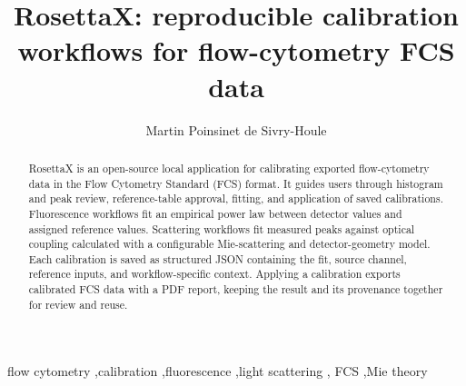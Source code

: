 \documentclass[preprint,12pt]{elsarticle}
\begin{document}
\begin{frontmatter}

\title{RosettaX: reproducible calibration workflows for flow-cytometry FCS data}

\author[amsterdamumc]{Martin Poinsinet de Sivry-Houle}

\begin{abstract}
RosettaX is an open-source local application for calibrating exported
flow-cytometry data in the Flow Cytometry Standard (FCS) format. It guides
users through histogram and peak review, reference-table approval, fitting,
and application of saved calibrations. Fluorescence workflows fit an
empirical power law between detector values and assigned reference values.
Scattering workflows fit measured peaks against optical coupling calculated
with a configurable Mie-scattering and detector-geometry model. Each
calibration is saved as structured JSON containing the fit, source channel,
reference inputs, and workflow-specific context. Applying a calibration
exports calibrated FCS data with a PDF report, keeping the result and its
provenance together for review and reuse.
\end{abstract}

\begin{keyword}
flow cytometry \sep calibration \sep fluorescence \sep light scattering \sep
FCS \sep Mie theory
\end{keyword}
\end{frontmatter}

\modulolinenumbers[1]
\linenumbers
\end{document}
